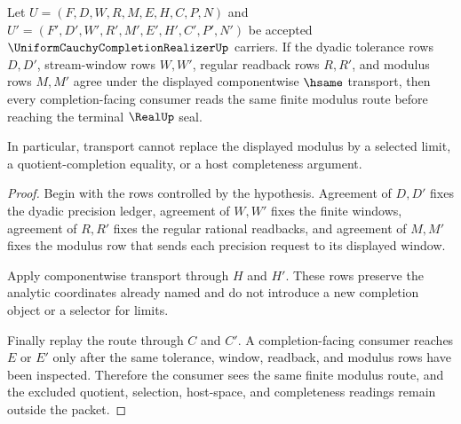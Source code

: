 \begin{theorem}
\label{thm:uniform-cauchy-completion-realizer-modulus-stability}
Let $U=(F,D,W,R,M,E,H,C,P,N)$ and $U'=(F',D',W',R',M',E',H',C',P',N')$ be accepted $\UniformCauchyCompletionRealizerUp$ carriers. If the dyadic tolerance rows $D,D'$, stream-window rows $W,W'$, regular readback rows $R,R'$, and modulus rows $M,M'$ agree under the displayed componentwise $\hsame$ transport, then every completion-facing consumer reads the same finite modulus route before reaching the terminal $\RealUp$ seal.

In particular, transport cannot replace the displayed modulus by a selected limit, a quotient-completion equality, or a host completeness argument.
\end{theorem}
\begin{proof}
Begin with the rows controlled by the hypothesis. Agreement of $D,D'$ fixes the dyadic precision ledger, agreement of $W,W'$ fixes the finite windows, agreement of $R,R'$ fixes the regular rational readbacks, and agreement of $M,M'$ fixes the modulus row that sends each precision request to its displayed window.

Apply componentwise transport through $H$ and $H'$. These rows preserve the analytic coordinates already named and do not introduce a new completion object or a selector for limits.

Finally replay the route through $C$ and $C'$. A completion-facing consumer reaches $E$ or $E'$ only after the same tolerance, window, readback, and modulus rows have been inspected. Therefore the consumer sees the same finite modulus route, and the excluded quotient, selection, host-space, and completeness readings remain outside the packet.
\end{proof}

